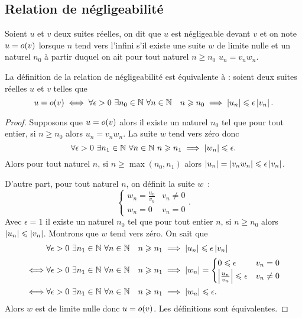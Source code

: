 \subsection{Relation de négligeabilité}

\begin{defdef}
  Soient \(u\) et \(v\) deux suites réelles, on dit que \(u\) est négligeable devant \(v\) et on note \(u=o\mathopen{}\left(v\right)\) lorsque \(n\) tend vers l'infini s'il existe une suite \(w\) de limite nulle et un naturel \(n_0\) à partir duquel on ait pour tout naturel \(n \geqslant n_0\) \(u_n = v_n w_n\).
\end{defdef}
\begin{prop}
  La définition de la relation de négligeabilité est équivalente à : soient deux suites réelles \(u\) et \(v\) telles que
  \begin{equation}
    u=o\mathopen{}\left(v\right) \iff \forall \epsilon > 0 \ \exists n_0 \in \mathbb{N} \ \forall n \in \mathbb{N} \quad n \geqslant n_0 \implies \left\lvert u_n\right\rvert \leqslant \epsilon \left\lvert v_n\right\rvert.
  \end{equation}
\end{prop}
\begin{proof}
  Supposons que \(u=o\mathopen{}\left(v\right)\) alors il existe un naturel \(n_0\) tel que pour tout entier, si \(n \geqslant n_0\) alors \(u_n = v_n w_n\). La suite \(w\) tend vers zéro donc
  \begin{equation}
    \forall \epsilon > 0 \ \exists n_1 \in \mathbb{N} \ \forall n \in \mathbb{N} \ n \geqslant n_1 \implies \left\lvert w_n\right\rvert \leqslant \epsilon.
  \end{equation}
  Alors pour tout naturel \(n\), si \(n \geqslant \max(n_0, n_1)\) alors \(\left\lvert u_n\right\rvert = \left\lvert v_n w_n\right\rvert \leqslant \epsilon \left\lvert v_n\right\rvert\).

  D'autre part, pour tout naturel \(n\), on définit la suite \(w\)~:
  \begin{equation}
    \begin{cases} w_n=\frac{u_n}{v_n} & v_n \neq 0 \\ w_n=0 & v_n=0\end{cases}.
  \end{equation}
  Avec \(\epsilon=1\) il existe un naturel \(n_0\) tel que pour tout entier \(n\), si \(n \geqslant n_0\) alors \(\left\lvert u_n\right\rvert \leqslant \left\lvert v_n\right\rvert\). Montrons que \(w\) tend vers zéro. On sait que
  \begin{align}
    & \forall \epsilon > 0 \ \exists n_1 \in \mathbb{N} \ \forall n \in \mathbb{N} \quad n \geqslant n_1 \implies \left\lvert u_n\right\rvert \leqslant \epsilon \left\lvert v_n\right\rvert \\ 
    \iff & \forall \epsilon > 0 \ \exists n_1 \in \mathbb{N} \ \forall n \in \mathbb{N} \quad n \geqslant n_1 \implies \left\lvert w_n\right\rvert= \begin{cases} 0 \leqslant \epsilon & v_n=0 \\ \left\lvert\frac{u_n}{v_n}\right\rvert \leqslant \epsilon & v_n\neq 0 \end{cases} \\
    \iff & \forall \epsilon > 0 \ \exists n_1 \in \mathbb{N} \ \forall n \in \mathbb{N} \quad n \geqslant n_1 \implies \left\lvert w_n\right\rvert \leqslant \epsilon.
  \end{align}
  Alors \(w\) est de limite nulle donc \(u=o\mathopen{}\left(v\right)\). Les définitions sont équivalentes.
\end{proof}
